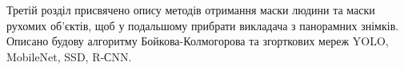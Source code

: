 Третій розділ присвячено опису методів отримання маски людини та маски
рухомих об'єктів, щоб у подальшому прибрати викладача з панорамних знімків.
Описано будову алгоритму Бойкова-Колмогорова та згорткових мереж 
YOLO, MobileNet, SSD, R-СNN.
